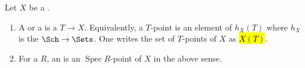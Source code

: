 \begin{definition} \label{definition:point_on_a_scheme_valued_on_a_scheme}
    Let $X$ be a .  

    \begin{enumerate}
        \item A  or a  is a  $T \to X$. Equivalently, a $T$-point is an element of $h_X(T)$ where $h_X$ is the  $\Sch \to \Sets$. One writes the set of $T$-points of $X$ as \hl{$X(T)$}.

        \item For a  $R$, an  is an $\operatorname{Spec} R$-point of $X$ in the above sense.
    \end{enumerate}
\end{definition}